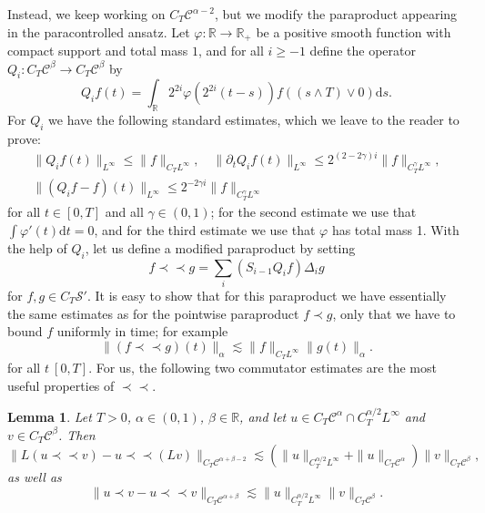 \documentclass[11pt,a4paper]{article}
\newcommand{\mathd}{\mathrm{d}}
\newcommand{\precprec}{\prec\!\!\!\prec}
\newtheorem{lemma}[theorem]{Lemma}
\theoremstyle{remark}
\newcommand{\R}{\mathbb{R}}
\newcommand{\CC}{\ensuremath{\mathscr{C}}}
\newcommand{\CS}{\ensuremath{\mathscr{S}}}
\begin{document}
Instead, we keep working on $C_{T} \CC^{\alpha -2}$, but we modify the paraproduct
appearing in the paracontrolled ansatz. Let $\varphi \colon \mathbb{R} \rightarrow \mathbb{R}_{+}$ be a positive smooth function with compact support and total
mass $1$, and for all $i \geqslant -1$ define the operator $Q_{i} \colon C_{T} \CC^{\beta} \rightarrow C_{T} \CC^{\beta}$ by
\[
   Q_{i} f ( t ) = \int_{\mathbb{R}} 2^{2i} \varphi ( 2^{2i} ( t-s ) ) f ( (s \wedge T ) \vee 0 ) \mathd s.
\]
For $Q_{i}$ we have the following standard estimates, which we leave to the reader to prove:
\begin{gather}\label{eq:Q-bounds}
   \| Q_{i} f ( t ) \|_{L^{\infty}} \leqslant \| f \|_{C_{T} L^{\infty}} , \hspace{1em} \| \partial_{t} Q_{i} f ( t ) \|_{L^{\infty}} \leqslant 2^{( 2-2 \gamma ) i} \| f \|_{C_{T}^{\gamma} L^{\infty}}, \\ \nonumber
   \| ( Q_{i} f-f ) ( t ) \|_{L^{\infty}} \leqslant 2^{-2 \gamma i} \| f \|_{C_{T}^{\gamma} L^{\infty}}
\end{gather}
for all $t \in [ 0,T ]$ and all $\gamma \in ( 0,1 )$; for the second estimate
we use that $\int \varphi' ( t ) \mathd t=0$, and for the third estimate we
use that $\varphi$ has total mass 1.
With the help of $Q_{i}$, let us define a modified paraproduct by setting
\[
   f \precprec g= \sum_{i} ( S_{i-1} Q_{i} f ) \Delta_{i} g
\]
for $f,g \in C_{T} \CS'$. It is easy to show that for this paraproduct we have
essentially the same estimates as for the pointwise paraproduct $f \prec g$,
only that we have to bound $f$ uniformly in time; for example
\[
   \| ( f \precprec g ) ( t ) \|_{\alpha} \lesssim \| f \|_{C_{T} L^{\infty}} \| g ( t ) \|_{\alpha} .
\]
for all $t \ [0,T]$. For us, the following two commutator estimates are the most useful properties of $\precprec$.

\begin{lemma}\label{lemma:mod-para-est}
  Let $T>0$, $\alpha \in (0,1)$, $\beta \in \R$, and let $u \in C_{T} \CC^{\alpha} \cap C^{\alpha/2}_T L^\infty$ and $v \in C_T \CC^\beta$. Then
  \begin{equation}\label{eq:mod-para-1}
     \| L(u \precprec v ) - u\precprec (Lv) \|_{C_T\CC^{\alpha+\beta -2}} \lesssim ( \| u \|_{C_{T}^{\alpha /2} L^{\infty}} + \| u \|_{C_{T} \CC^\alpha} ) \| v \|_{C_T\CC^\beta},
  \end{equation}
  as well as
  \begin{equation}\label{eq:paraproduct difference}
     \|u \prec v - u \precprec v\|_{C_T\CC^{\alpha+\beta}} \lesssim \| u \|_{C_{T}^{\alpha /2} L^{\infty}} \| v \|_{C_T\CC^\beta}.
  \end{equation}
\end{lemma}
\end{document}
